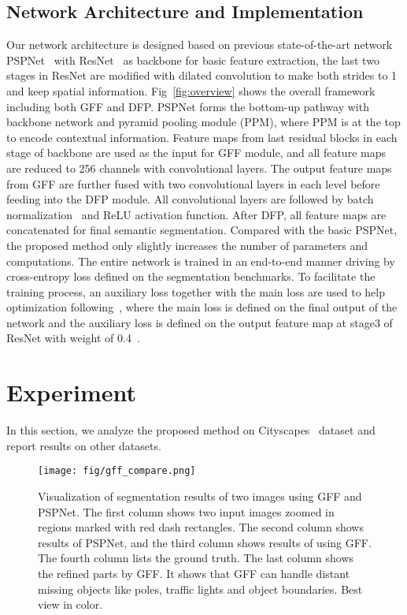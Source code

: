 \documentclass[letterpaper]{article} \usepackage{aaai20}  \usepackage{times}  \usepackage{helvet} \usepackage{courier}  \usepackage[hyphens]{url}  \usepackage{graphicx} \urlstyle{rm} \def\UrlFont{\rm}  \usepackage{graphicx}  \usepackage{amsmath}
\begin{document}
\subsection{Network Architecture and Implementation}
Our network architecture is designed based on previous state-of-the-art network PSPNet~\cite{pspnet} with ResNet~\cite{resnet} as backbone for basic feature extraction, the last two stages in ResNet are modified with dilated convolution to make both strides to 1 and keep spatial information. Fig~\ref{fig:overview} shows the overall framework including both GFF and DFP. PSPNet forms the bottom-up pathway with backbone network and pyramid pooling module (PPM), where PPM is at the top to encode contextual information. Feature maps from last residual blocks in each stage of backbone are used as the input for GFF module, and all feature maps are reduced to 256 channels with  convolutional layers. The output feature maps from GFF are further fused with two  convolutional layers in each level before feeding into the DFP module. All convolutional layers are followed by batch normalization~\cite{batchnorm} and ReLU activation function. After DFP, all feature maps are concatenated for final semantic segmentation. Compared with the basic PSPNet, the proposed method only slightly increases the number of parameters and computations. The entire network is trained in an end-to-end manner driving by cross-entropy loss defined on the segmentation benchmarks. To facilitate the training process, an auxiliary loss together with the main loss are used to help optimization following~\cite{dsn}, where the main loss is defined on the final output of the network and the auxiliary loss is defined on the output feature map at stage3 of ResNet with weight of 0.4~\cite{pspnet}. \section{Experiment}
In this section, we analyze the proposed method on Cityscapes ~\cite{Cityscapes}dataset and report results on other datasets.

\begin{figure}
\centering
\texttt{[image: fig/gff\_compare.png]}
\caption{
\small{
Visualization of segmentation results of two images using GFF and PSPNet. The first column shows two input images zoomed in regions marked with red dash rectangles. The second column shows results of PSPNet, and the third column shows results of using GFF. The fourth column lists the ground truth. The last column shows the refined parts by GFF. It shows that GFF can handle distant missing objects like poles, traffic lights and object boundaries. Best view in color.}}
\label{fig:gff_prediction_result}
\end{figure}
\end{document}
